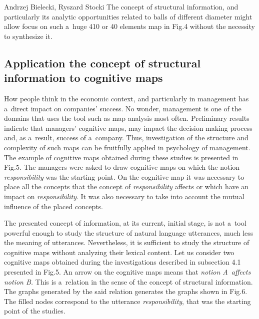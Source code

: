 \begin{artengenv2auth}{Andrzej Bielecki, Ryszard Stocki}
The concept of structural information, and particularly its analytic opportunities related to balls of different diameter might allow focus on such a~huge 410 
\parencite[][]{iasiello_whats_2023} %
 or 40 elements map in Fig.4 without the necessity to synthesize it.



\subsection{Application the concept of structural information to cognitive maps}



How people think in the economic context, and particularly in management has a~direct impact on companies' success. No wonder, management is one of the domains that uses the tool such as map analysis most often. Preliminary results indicate that managers' cognitive maps, may impact the decision making process and, as a~result, success of a~company. Thus, investigation of the structure and complexity of such maps can be fruitfully applied in psychology of management. The example of cognitive maps obtained during these studies is presented in Fig.5. The managers were asked to draw cognitive maps on which the notion \textit{responsibility} was the starting point. On the cognitive map it was necessary to place all the concepts that the concept of \textit{responsibility} affects or which have an impact on \textit{responsibility}. It was also necessary to take into account the mutual influence of the placed concepts.



The presented concept of information, at its current, initial stage, is not a~tool powerful enough to study the structure of natural language utterances, much less the meaning of utterances. Nevertheless, it is sufficient to study the structure of cognitive maps without analyzing their lexical content. Let us consider two cognitive maps obtained during the investigations described in subsection 4.1 presented in Fig.5. An arrow on the cognitive maps means that \textit{notion A~affects notion B.} This is a~relation in the sense of the concept of structural information. The graphs generated by the said relation generates the graphs shown in Fig.6. The filled nodes correspond to the utterance \textit{responsibility}, that was the starting point of the studies.

\begin{figure}[htbp]
\begin{adjustwidth}{-.1\textwidth}{}
  \begin{minipage}{.5\linewidth}
    \centering
  \begin{tikzpicture}[scale=0.6, transform shape,
   centernode/.style={ellipse, align=center, minimum width=2cm},
        mynode/.style={draw, align=center, rounded corners, minimum width=1cm, minimum height=0.5cm},
        myarrow/.style={<-, >=latex, thick},
        node distance=1cm and 2cm
    ]
    

\end{tikzpicture}
\end{minipage}
\end{adjustwidth}
\end{figure}
\end{artengenv2auth}
